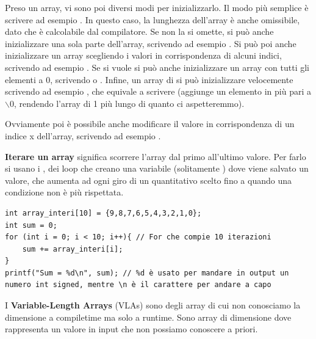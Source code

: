\documentclass[11pt, a4paper, titlepage, oneside]{scrbook}
\begin{document}
Preso un array, vi sono poi diversi modi per inizializzarlo. Il modo più semplice è scrivere ad esempio . In questo caso, la lunghezza dell'array è anche omissibile, dato che è calcolabile dal compilatore. Se non la si omette, si può anche inizializzare una sola parte dell'array, scrivendo ad esempio . Si può poi anche inizializzare un array scegliendo i valori in corrispondenza di alcuni indici, scrivendo ad esempio . Se si vuole si può anche inizializzare un array con tutti gli elementi a 0, scrivendo  o . Infine, un array di  si può inizializzare velocemente scrivendo ad esempio , che equivale a scrivere  (aggiunge un elemento in più pari a $\backslash0$, rendendo l'array di 1 più lungo di quanto ci aspetteremmo). 

Ovviamente poi è possibile anche modificare il valore in corrispondenza di un indice x dell'array, scrivendo ad esempio .

\begin{Proprieta}
\label{prop-iterare-array}
\textbf{Iterare un array} significa scorrere l'array dal primo all'ultimo valore. Per farlo si usano i , dei loop che creano una variabile (solitamente ) dove viene salvato un valore, che aumenta ad ogni giro di un quantitativo scelto fino a quando una condizione non è più rispettata.  
\end{Proprieta}

\begin{lstlisting}[style=C]
int array_interi[10] = {9,8,7,6,5,4,3,2,1,0};
int sum = 0;
for (int i = 0; i < 10; i++){ // For che compie 10 iterazioni
    sum += array_interi[i];
}
printf("Sum = %d\n", sum); // %d è usato per mandare in output un numero int signed, mentre \n è il carattere per andare a capo
\end{lstlisting}

\begin{Definizione}
\label{def-VLA}
I \textbf{Variable-Length Arrays} (VLAs) sono degli array di cui non conosciamo la dimensione a compiletime ma solo a runtime. Sono array di dimensione  dove  rappresenta un valore in input che non possiamo conoscere a priori. 
\end{Definizione}
\end{document}
